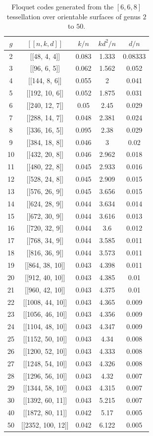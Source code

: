 \documentclass[%
reprint,
amsmath,amssymb,
aps,
]{revtex4-2}
\begin{document}
\begin{table}[b]
	\caption{\label{tab7}
		Floquet codes generated from the $[6,6,8]$ tessellation over orientable surfaces of genus $2$ to $50$.}
	\begin{ruledtabular}
		\begin{tabular}{|c|c|c|c|c|}
			$g$ & $[[n,k,d]]$ & $k/n$ & $kd^{2}/n$ & $d/n$ \\ \hline
	2 & [[48,	4,	4]] &	0.083 &	1.333 &	0.08333 \\
	3 & [[96,	6,	5]] & 	0.062 &	1.562 &	0.052  \\
	4 &	[[144,	8,	6]] &  0.055 &	2 &	0.041 \\
	5 &	[[192,	10,	6]] &  0.052 &	1.875 &	0.031 \\
	6 & [[240,	12,	7]] &  0.05 &	2.45 &	0.029 \\
	7 & [[288,	14,	7]] &  0.048 &	2.381 &	0.024 \\
	8 & [[336,	16,	5]] &   0.095 &	2.38 &	0.029 \\
	9 & [[384,	18,	8]] &   0.046 &	3 &	0.02 \\
	10 & [[432,	20,	8]] &   0.046 &	2.962 &	0.018 \\
	11 & [[480,	22,	8]] &   0.045 &	2.933 &	0.016 \\
	12 & [[528,	24,	8]] &   0.045 &	2.909 &	0.015 \\
	13 & [[576,	26,	9]] & 	0.045 &	3.656 &	0.015 \\
	14 & [[624,	28,	9]] & 	0.044 &	3.634 &	0.014  \\
	15 & [[672,	30,	9]] &  0.044 &	3.616 &	0.013  \\
	16 & [[720,	32,	9]] &   0.044 &	3.6 &	0.012 \\
	17 & [[768,	34,	9]] &  0.044 &	3.585 &	0.011 \\
	18 & [[816,	36,	9]] &   0.044 &	3.573 &	0.011 \\
	19 & [[864,	38,	10]] &  0.043 &	4.398 &	0.011 \\
	20 & [[912,	40,	10]] &   0.043 &	4.385 &	0.01 \\
	21 & [[960,	42,	10]] & 0.043 &	4.375 &	0.01 \\
	22 & [[1008,	44,	10]] &  0.043 &	4.365 &	0.009 \\
	23 & [[1056,	46,	10]] &  0.043 &	4.356 &	0.009 \\
	24 & [[1104,	48,	10]] &  0.043 &	4.347 &	0.009 \\
	25 & [[1152,	50,	10]] &   0.043 &	4.34 &	0.008 \\
	26 & [[1200,	52,	10]] &   0.043 &	4.333 &	0.008 \\
	27 & [[1248,	54,	10]] &  0.043 &	4.326 &	0.008 \\
	28 & [[1296,	56,	10]] &   0.043 &	4.32 &	0.007 \\
	29 & [[1344,	58,	10]] &  0.043 &	4.315 &	0.007 \\
	30 & [[1392,	60,	11]] &  0.043 &	5.215 &	0.007 \\
	40 & [[1872,	80,	11]] &  0.042 &	5.17 &	0.005 \\
	50 & [[2352,	100,	12]] &  0.042 &	6.122 &	0.005 \\
			\end{tabular}
\end{ruledtabular}
\end{table}
\end{document}

